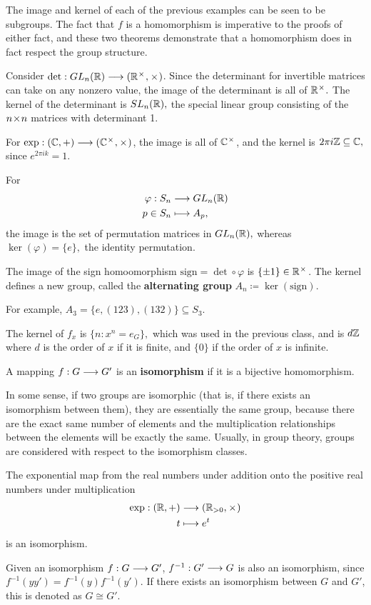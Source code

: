The image and kernel of each of the previous examples can be seen to be subgroups. The fact that $f$ is a homomorphism is imperative to the proofs of either fact, and these two theorems demonstrate that a homomorphism does in fact respect the group structure.
\begin{example}
Consider $\text{det}: GL_n(\mathbb R) \longrightarrow (\mathbb R^{\hspace{0.05em}{\times}\hspace{0.05em}}, \hspace{0.05em}{\times}\hspace{0.05em})$. Since the determinant for invertible matrices can take on any nonzero value, the image of the determinant is all of $\mathbb R^{\hspace{0.05em}{\times}\hspace{0.05em}}.$ The kernel of the determinant is $SL_n(\mathbb R),$ the special linear group consisting of the $n \hspace{0.05em}{\times}\hspace{0.05em} n$ matrices with determinant 1.
\end{example}
\begin{example}
For $\text{exp}: (\mathbb C, +) \longrightarrow (\mathbb C^{\hspace{0.05em}{\times}\hspace{0.05em}}, \hspace{0.05em}{\times}\hspace{0.05em})$, the image is all of $\mathbb C^{\hspace{0.05em}{\times}\hspace{0.05em}}$, and the kernel is $2\pi i\mathbb Z \subseteq \mathbb C,$ since $e^{2\pi ik} = 1.$
\end{example}
\begin{example}
For \begin{align*}
\varphi: S_n &\longrightarrow GL_n(\mathbb R) \\
p\in S_n &\longmapsto A_p,
\end{align*} the image is the set of permutation matrices in $GL_n(\mathbb R),$ whereas $\ker(\varphi) = \{e\},$ the identity permutation.
\end{example}
\begin{example}
The image of the sign homoomorphism $\text{sign} = \det \circ \varphi$ is $\{\pm 1\} \in \mathbb R^{\hspace{0.05em}{\times}\hspace{0.05em}}$. The kernel defines a new group, called the \textbf{alternating group} $A_n \coloneqq \ker(\text{sign}).$
\end{example}

For example, $A_3 = \{e, (123), (132)\} \subseteq S_3.$
\begin{example}
The kernel of $f_x$ is $\{n: x^n = e_G\},$ which was used in the previous class, and is $d\mathbb Z$ where $d$ is the order of $x$ if it is finite, and $\{0\}$ if the order of $x$ is infinite. 
\end{example}

\begin{definition}
A mapping $f: G \longrightarrow G'$ is an \textbf{isomorphism} if it is a bijective homomorphism.
\end{definition}
In some sense, if two groups are isomorphic (that is, if there exists an isomorphism between them), they are essentially the same group, because there are the exact same number of elements and the multiplication relationships between the elements will be exactly the same. Usually, in group theory, groups are considered with respect to the isomorphism classes. 
\begin{example}
The exponential map from the real numbers under addition onto the positive real numbers under multiplication \begin{align*}
    \text{exp}: (\mathbb R, +) &\longrightarrow (\mathbb R_{>0}, \hspace{0.05em}{\times}\hspace{0.05em}) \\
    t &\longmapsto e^t
\end{align*} is an isomorphism.
\end{example}

Given an isomorphism $f: G \longrightarrow G'$, $f^{-1}: G' \longrightarrow G$ is also an isomorphism, since $f^{-1}(yy') = f^{-1}(y)f^{-1}(y')$. If there exists an isomorphism between $G$ and $G'$, this is denoted as $G \cong G'$. 

\newpage